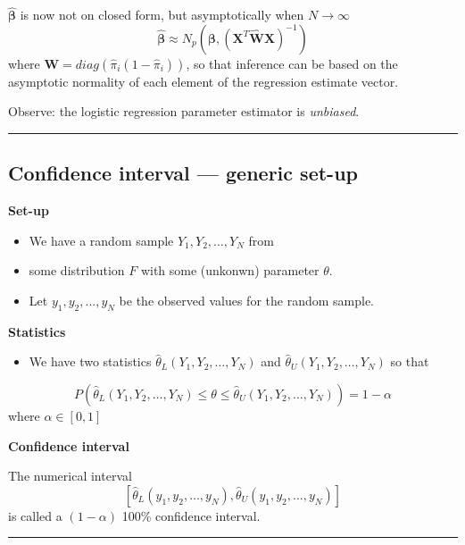 \documentclass[
  letterpaper,
  DIV=11,
  numbers=noendperiod]{scrartcl}
\providecommand{\tightlist}{%
  \setlength{\itemsep}{0pt}\setlength{\parskip}{0pt}}\usepackage{longtable,booktabs,array}
\begin{document}
\(\hat{\boldsymbol{\beta}}\) is now not on closed form, but
asymptotically when \(N \rightarrow \infty\)
\[\hat{\boldsymbol\beta} \approx N_{p}(\boldsymbol\beta,(\boldsymbol X^T\hat{\boldsymbol{W}}\boldsymbol X)^{-1})\]
where \(\boldsymbol W=diag(\hat{\pi}_i(1-\hat{\pi}_i))\), so that
inference can be based on the asymptotic normality of each element of
the regression estimate vector.

Observe: the logistic regression parameter estimator is \emph{unbiased}.

\begin{center}\rule{0.5\linewidth}{0.5pt}\end{center}

\hypertarget{confidence-interval-generic-set-up}{%
\subsection{Confidence interval --- generic
set-up}\label{confidence-interval-generic-set-up}}

\textbf{Set-up}

\begin{itemize}
\tightlist
\item
  We have a random sample \(Y_1,Y_2,\ldots,Y_N\) from
\item
  some distribution \(F\) with some (unkonwn) parameter \(\theta\).
\item
  Let \(y_1,y_2,\ldots,y_N\) be the observed values for the random
  sample.
\end{itemize}

\textbf{Statistics}

\begin{itemize}
\tightlist
\item
  We have two statistics \(\hat{\theta}_L(Y_1,Y_2,\ldots,Y_N)\) and
  \(\hat{\theta}_U(Y_1,Y_2,\ldots,Y_N)\) so that
\end{itemize}

\[P(\hat{\theta}_L(Y_1,Y_2,\ldots,Y_N)\le \theta \le \hat{\theta}_U(Y_1,Y_2,\ldots,Y_N))=1-\alpha\]
where \(\alpha\in [0,1]\)

\textbf{Confidence interval}

The numerical interval
\[[\hat{\theta}_L(y_1,y_2,\ldots,y_N),\hat{\theta}_U(y_1,y_2,\ldots,y_N)]\]
is called a \((1-\alpha)\) 100\% confidence interval.

\begin{center}\rule{0.5\linewidth}{0.5pt}\end{center}
\end{document}

